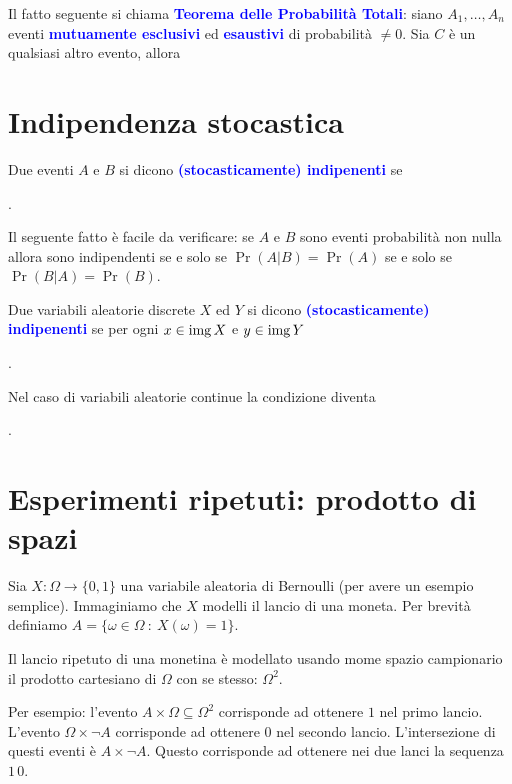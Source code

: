 \documentclass[12pt,openany]{book}
\def\range{\mathop{\rm img}}
\def\emph#1{\textcolor{blue}{\textbf{\boldmath #1}}}
\theoremstyle{mio}
\theoremstyle{liscio}
\begin{document}
Il fatto seguente si chiama \emph{Teorema delle Probabilità Totali}: siano $A_1,\dots,A_n$ eventi \emph{mutuamente esclusivi\/} ed \emph{esaustivi} di probabilità $\neq0$. Sia $C$ \`e un qualsiasi altro evento, allora


\hfill{}\clearpage\section{Indipendenza stocastica}
\label{indipendenza}

Due eventi $A$ e $B$ si dicono \emph{(stocasticamente) indipenenti\/} se 

. 

Il seguente fatto è facile da verificare: se $A$ e $B$ sono eventi probabilità non nulla allora sono indipendenti se e solo se $\Pr(A|B)=\Pr(A)$ se e solo se $\Pr(B|A)=\Pr(B)$.

Due variabili aleatorie discrete $X$ ed $Y$ si dicono \emph{(stocasticamente) indipenenti\/} se per ogni $x\in\range X$ e $y\in\range Y$

.

Nel caso di variabili aleatorie continue la condizione diventa


.



\hfill{}\clearpage\section{Esperimenti ripetuti: prodotto di spazi}

Sia $X:\Omega\to\{0,1\}$ una variabile aleatoria di Bernoulli (per avere un esempio semplice). Immaginiamo che $X$ modelli il lancio di una moneta. Per brevità definiamo $A=\{\omega\in\Omega\ :\  X(\omega)=1\}$.

Il lancio ripetuto di una monetina è modellato usando mome spazio campionario il prodotto cartesiano di $\Omega$ con se stesso: $\Omega^2$.

Per esempio: l'evento  $A\times\Omega\subseteq\Omega^2$  corrisponde  ad ottenere $1$ nel primo lancio. L'evento $\Omega\times\!\neg A$ corrisponde ad ottenere $0$ nel secondo lancio. L'intersezione di questi eventi è $A\times\!\neg A$. Questo corrisponde ad ottenere nei due lanci la sequenza $1\,0$. 
\end{document}
